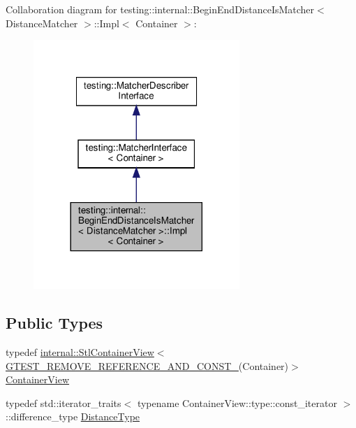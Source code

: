 Collaboration diagram for testing\+:\+:internal\+:\+:Begin\+End\+Distance\+Is\+Matcher$<$ Distance\+Matcher $>$\+:\+:Impl$<$ Container $>$\+:
\nopagebreak
\begin{figure}[H]
\begin{center}
\leavevmode
\includegraphics[width=221pt]{classtesting_1_1internal_1_1_begin_end_distance_is_matcher_1_1_impl__coll__graph}
\end{center}
\end{figure}
\subsection*{Public Types}
\begin{DoxyCompactItemize}
\item 
typedef \hyperlink{classtesting_1_1internal_1_1_stl_container_view}{internal\+::\+Stl\+Container\+View}$<$ \hyperlink{gtest-internal_8h_a874567b176266188fabfffb8393267ce}{G\+T\+E\+S\+T\+\_\+\+R\+E\+M\+O\+V\+E\+\_\+\+R\+E\+F\+E\+R\+E\+N\+C\+E\+\_\+\+A\+N\+D\+\_\+\+C\+O\+N\+S\+T\+\_\+}(Container)$>$ \hyperlink{classtesting_1_1internal_1_1_begin_end_distance_is_matcher_1_1_impl_a5c76ede38c6143430f56e02e9024f535}{Container\+View}
\item 
typedef std\+::iterator\+\_\+traits$<$ typename Container\+View\+::type\+::const\+\_\+iterator $>$\+::difference\+\_\+type \hyperlink{classtesting_1_1internal_1_1_begin_end_distance_is_matcher_1_1_impl_a10d901c49e2793dae6bcce6fa1a4e9fe}{Distance\+Type}
\end{DoxyCompactItemize}
